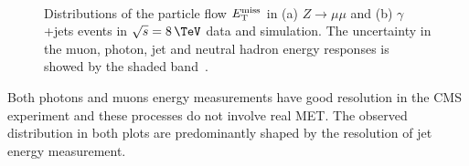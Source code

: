 \begin{figure}[!htp]%
\centering
{}\qquad
{}\\
 \caption[Distributions of the particle flow $\MET$ in $Z\rightarrow\mu\mu$ and $\gamma$+jets events in $\sqrt{s}=8\,\TeV$ data and simulation.]{Distributions of the particle flow $\MET$ in (a) $Z\rightarrow\mu\mu$ and (b) $\gamma$+jets events in $\sqrt{s}=8\,\TeV$ data and simulation. The uncertainty in the muon, photon, jet and neutral hadron energy responses is showed by the shaded band~\cite{ARTICLE:CMSMETPerformance8TeV}.}
\label{FIGURE:EventReconstructionAndSimulation_METDistributionZmumu}
\end{figure}

Both photons and muons energy measurements have good resolution in the \gls{CMS} experiment and these processes do not involve real \gls{MET}. The observed distribution in both plots are predominantly shaped by the resolution of jet energy measurement.

